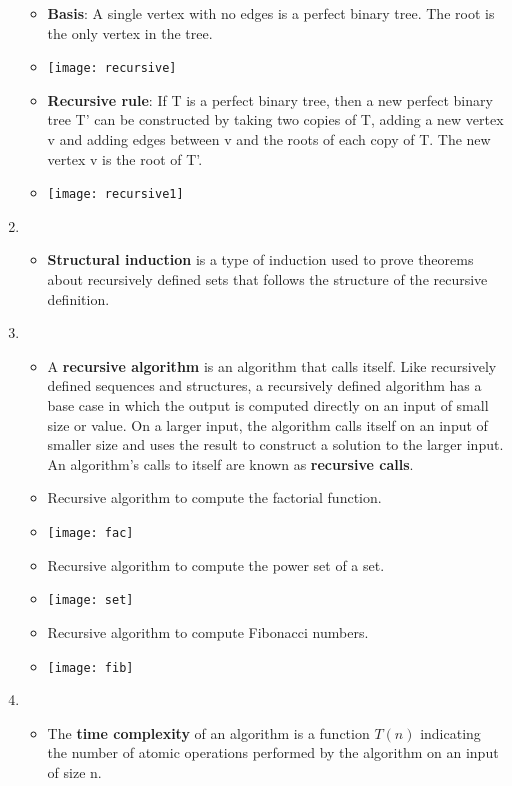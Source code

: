 \documentclass[12pt,a4paper]{article}
\begin{document}
\begin{enumerate}
\begin{itemize}
    \item \textbf{Basis}: A single vertex with no edges is a perfect binary tree. The root is the only vertex in the tree.
    \item[] \texttt{[image: recursive]}
    \item \textbf{Recursive rule}: If T is a perfect binary tree, then a new perfect binary tree T' can be constructed by taking two copies of T, adding a new vertex v and adding edges between v and the roots of each copy of T. The new vertex v is the root of T'.
    \item[] \texttt{[image: recursive1]}
  \end{itemize}
  \item {}
  \begin{itemize}
    \item \textbf{Structural induction} is a type of induction used to prove theorems about recursively defined sets that follows the structure of the recursive definition.
  \end{itemize}
  \item {}
  \begin{itemize}
    \item A \textbf{recursive algorithm} is an algorithm that calls itself. Like recursively defined sequences and structures, a recursively defined algorithm has a base case in which the output is computed directly on an input of small size or value. On a larger input, the algorithm calls itself on an input of smaller size and uses the result to construct a solution to the larger input. An algorithm's calls to itself are known as \textbf{recursive calls}.
    \item Recursive algorithm to compute the factorial function.
    \item[] \texttt{[image: fac]} 
    \item Recursive algorithm to compute the power set of a set.
    \item[] \texttt{[image: set]} 
    \item Recursive algorithm to compute Fibonacci numbers.
    \item[] \texttt{[image: fib]} 
  \end{itemize}
  \item {}
  \begin{itemize}
    \item The \textbf{time complexity} of an algorithm is a function \(T(n)\) indicating the number of atomic operations performed by the algorithm on an input of size n.

\end{itemize}
\end{enumerate}
\end{document}
